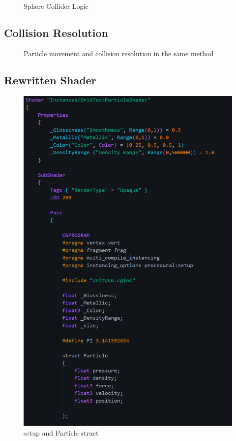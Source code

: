 \documentclass[12pt]{article}
\newcommand{\wideimage}[2][]{%
  \makebox[\textwidth][c]{\texttt{[image: \#2]}}%
}
\begin{document}
    \begin{figure}[H]
        \wideimage[]{sphereLogicGPU.png}
        \caption{Sphere Collider Logic}
    \end{figure}

    \subsection{Collision Resolution}

    \begin{figure}[H]
        \wideimage[]{moveParticlesGPU.png}
        \caption{Particle movement and collision resolution in the same method}
    \end{figure}

    \subsection{Rewritten Shader}

    \begin{figure}[H]
        \centering
        \includegraphics[height=0.8\textheight]{newShader1.png}
        \caption{setup and Particle struct}
    \end{figure}
\end{document}
